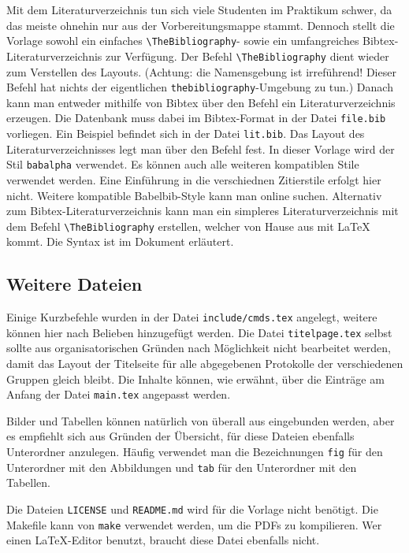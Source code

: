 Mit dem Literaturverzeichnis tun sich viele Studenten im Praktikum schwer, da 
das meiste ohnehin nur aus der Vorbereitungsmappe stammt. Dennoch stellt die 
Vorlage sowohl ein einfaches \verb|\TheBibliography|- sowie ein umfangreiches 
Bibtex-Literaturverzeichnis zur Verfügung. Der Befehl \verb|\TheBibliography| 
dient wieder zum Verstellen des Layouts. (Achtung: die Namensgebung ist 
irreführend! Dieser Befehl hat nichts der eigentlichen 
\verb|thebibliography|-Umgebung zu tun.) Danach kann man entweder mithilfe von 
Bibtex über den Befehl \verb|| ein Literaturverzeichnis 
erzeugen. Die Datenbank muss dabei im Bibtex-Format in der Datei \verb|file.bib| 
vorliegen. Ein Beispiel befindet sich in der Datei \verb|lit.bib|. Das Layout 
des Literaturverzeichnisses legt man über den Befehl 
\verb|| fest. In dieser Vorlage wird der Stil 
\verb|babalpha| verwendet. Es können auch alle weiteren kompatiblen Stile 
verwendet werden. Eine Einführung in die verschiednen Zitierstile erfolgt  hier 
nicht. Weitere kompatible Babelbib-Style kann man online suchen. Alternativ zum 
Bibtex-Literaturverzeichnis kann man ein simpleres Literaturverzeichnis mit dem 
Befehl \verb|\TheBibliography| erstellen, welcher von Hause aus mit LaTeX kommt. 
Die Syntax ist im Dokument erläutert.

\subsection{Weitere Dateien}
Einige Kurzbefehle wurden in der Datei \verb|include/cmds.tex| 
angelegt, weitere können hier nach Belieben hinzugefügt werden. Die Datei 
\verb|titelpage.tex| selbst sollte aus organisatorischen Gründen nach 
Möglichkeit nicht bearbeitet werden, damit das Layout der Titelseite für alle 
abgegebenen Protokolle der verschiedenen Gruppen gleich bleibt. Die Inhalte 
können, wie erwähnt, über die Einträge am Anfang der Datei \verb|main.tex| 
angepasst werden.

Bilder und Tabellen können natürlich von überall aus eingebunden werden, aber 
es empfiehlt sich aus Gründen der Übersicht, für diese Dateien ebenfalls 
Unterordner anzulegen. Häufig verwendet man die Bezeichnungen \verb|fig| für den 
Unterordner mit den Abbildungen und \verb|tab| für den Unterordner mit den 
Tabellen.

Die Dateien \verb|LICENSE| und \verb|README.md| wird für die Vorlage nicht 
benötigt. Die Makefile kann von \verb|make| verwendet werden, um die PDFs zu 
kompilieren. Wer einen LaTeX-Editor benutzt, braucht diese Datei ebenfalls 
nicht.



